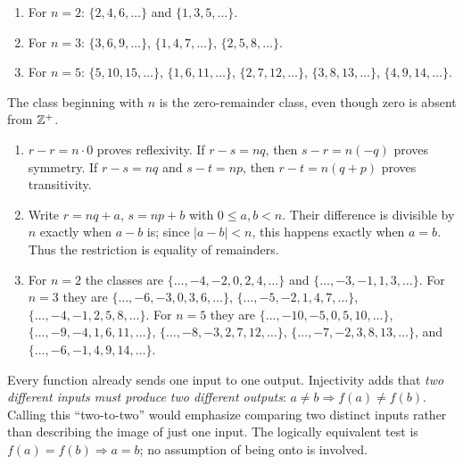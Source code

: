 \begin{enumerate}[label=(\alph*)]
\item For $n=2$: $\{2,4,6,\ldots\}$ and $\{1,3,5,\ldots\}$.
\item For $n=3$: $\{3,6,9,\ldots\}$, $\{1,4,7,\ldots\}$, $\{2,5,8,\ldots\}$.
\item For $n=5$: $\{5,10,15,\ldots\}$, $\{1,6,11,\ldots\}$, $\{2,7,12,\ldots\}$, $\{3,8,13,\ldots\}$, $\{4,9,14,\ldots\}$.
\end{enumerate}
The class beginning with $n$ is the zero-remainder class, even though zero is absent from $\mathbb{Z}^+$.


\begin{enumerate}[label=(\alph*)]
\item $r-r=n\cdot0$ proves reflexivity. If $r-s=nq$, then $s-r=n(-q)$ proves symmetry. If $r-s=nq$ and $s-t=np$, then $r-t=n(q+p)$ proves transitivity.
\item Write $r=nq+a$, $s=np+b$ with $0\le a,b<n$. Their difference is divisible by $n$ exactly when $a-b$ is; since $|a-b|<n$, this happens exactly when $a=b$. Thus the restriction is equality of remainders.
\item For $n=2$ the classes are $\{\ldots,-4,-2,0,2,4,\ldots\}$ and $\{\ldots,-3,-1,1,3,\ldots\}$. For $n=3$ they are $\{\ldots,-6,-3,0,3,6,\ldots\}$, $\{\ldots,-5,-2,1,4,7,\ldots\}$, $\{\ldots,-4,-1,2,5,8,\ldots\}$. For $n=5$ they are $\{\ldots,-10,-5,0,5,10,\ldots\}$, $\{\ldots,-9,-4,1,6,11,\ldots\}$, $\{\ldots,-8,-3,2,7,12,\ldots\}$, $\{\ldots,-7,-2,3,8,13,\ldots\}$, and $\{\ldots,-6,-1,4,9,14,\ldots\}$.
\end{enumerate}


Every function already sends one input to one output. Injectivity adds that \emph{two different inputs must produce two different outputs}: $a\ne b\Rightarrow f(a)\ne f(b)$. Calling this ``two-to-two'' would emphasize comparing two distinct inputs rather than describing the image of just one input. The logically equivalent test is $f(a)=f(b)\Rightarrow a=b$; no assumption of being onto is involved.
